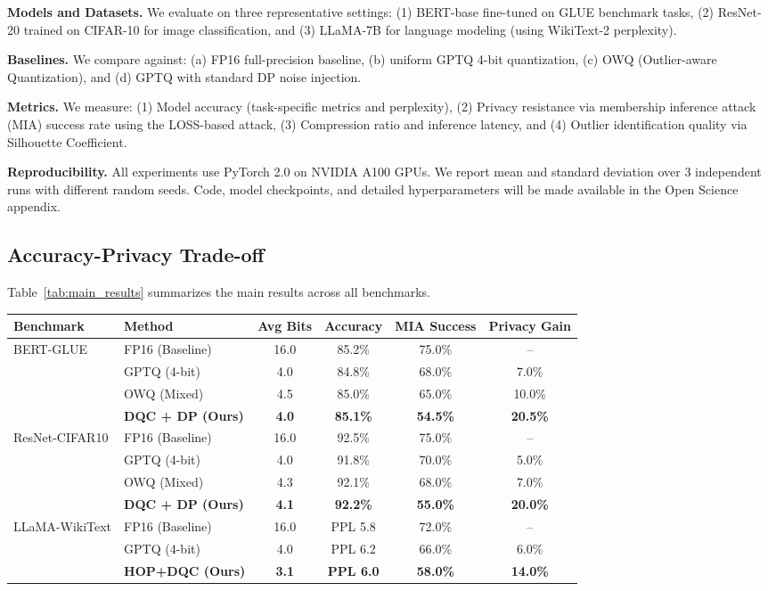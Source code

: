 \documentclass[letterpaper,twocolumn,10pt]{article}
\begin{document}
\textbf{Models and Datasets.} We evaluate on three representative settings: (1) BERT-base fine-tuned on GLUE benchmark tasks, (2) ResNet-20 trained on CIFAR-10 for image classification, and (3) LLaMA-7B for language modeling (using WikiText-2 perplexity).

\textbf{Baselines.} We compare against: (a) FP16 full-precision baseline, (b) uniform GPTQ 4-bit quantization, (c) OWQ (Outlier-aware Quantization), and (d) GPTQ with standard DP noise injection.

\textbf{Metrics.} We measure: (1) Model accuracy (task-specific metrics and perplexity), (2) Privacy resistance via membership inference attack (MIA) success rate using the LOSS-based attack, (3) Compression ratio and inference latency, and (4) Outlier identification quality via Silhouette Coefficient.

\textbf{Reproducibility.} All experiments use PyTorch 2.0 on NVIDIA A100 GPUs. We report mean and standard deviation over 3 independent runs with different random seeds. Code, model checkpoints, and detailed hyperparameters will be made available in the Open Science appendix.

\subsection{Accuracy-Privacy Trade-off}

Table~\ref{tab:main_results} summarizes the main results across all benchmarks.

\begin{table*}[t]
\centering
\caption{Quantization Performance and Privacy Resistance}
\label{tab:main_results}
\begin{tabular}{@{}llcccc@{}}
\toprule
\textbf{Benchmark} & \textbf{Method} & \textbf{Avg Bits} & \textbf{Accuracy} & \textbf{MIA Success} & \textbf{Privacy Gain} \\
\midrule
\multirow{4}{*}{BERT-GLUE} 
& FP16 (Baseline) & 16.0 & 85.2\% & 75.0\% & -- \\
& GPTQ (4-bit) & 4.0 & 84.8\% & 68.0\% & 7.0\% \\
& OWQ (Mixed) & 4.5 & 85.0\% & 65.0\% & 10.0\% \\
& \textbf{DQC + DP (Ours)} & \textbf{4.0} & \textbf{85.1\%} & \textbf{54.5\%} & \textbf{20.5\%} \\
\midrule
\multirow{4}{*}{ResNet-CIFAR10}
& FP16 (Baseline) & 16.0 & 92.5\% & 75.0\% & -- \\
& GPTQ (4-bit) & 4.0 & 91.8\% & 70.0\% & 5.0\% \\
& OWQ (Mixed) & 4.3 & 92.1\% & 68.0\% & 7.0\% \\
& \textbf{DQC + DP (Ours)} & \textbf{4.1} & \textbf{92.2\%} & \textbf{55.0\%} & \textbf{20.0\%} \\
\midrule
\multirow{4}{*}{LLaMA-WikiText}
& FP16 (Baseline) & 16.0 & PPL 5.8 & 72.0\% & -- \\
& GPTQ (4-bit) & 4.0 & PPL 6.2 & 66.0\% & 6.0\% \\
& \textbf{HOP+DQC (Ours)} & \textbf{3.1} & \textbf{PPL 6.0} & \textbf{58.0\%} & \textbf{14.0\%} \\
\bottomrule
\end{tabular}
\end{table*}
\end{document}
